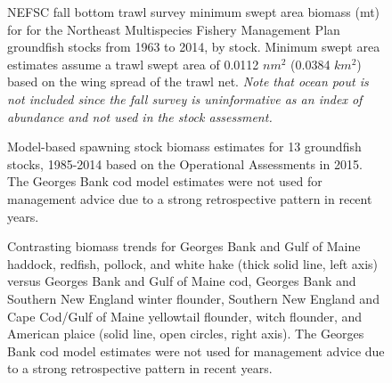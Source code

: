 	\begin{figure}
		\centering	
		\captionsetup{singlelinecheck=off}
		\caption[.]{NEFSC fall bottom trawl survey minimum swept area biomass (mt) for for the Northeast Multispecies Fishery Management Plan groundfish stocks from 1963 to 2014, by stock. Minimum swept area estimates assume a trawl swept area of 0.0112 $nm^{2}$ (0.0384 $km^{2}$) based on the wing spread of the trawl net. \textit{Note that ocean pout is not included since the fall survey is uninformative as an index of abundance and not used in the stock assessment.}	}
		\label{nefscFallMinSweptAreaBiomass}
	\end{figure}
	\clearpage





	\begin{figure}
		\centering	
		\captionsetup{singlelinecheck=off}
		\caption[.]{Model-based spawning stock biomass estimates for 13 groundfish stocks, 1985-2014 based on the Operational Assessments in 2015.  The Georges Bank cod model estimates were not used for management advice due to a strong retrospective pattern in recent years.}
		\label{ModelB}
	\end{figure}
	\clearpage


	\begin{figure}
		\centering	
		\captionsetup{singlelinecheck=off}
		\caption[.]{Contrasting biomass trends for  Georges Bank and Gulf of Maine haddock, redfish, pollock, and white hake (thick solid line, left axis) versus Georges Bank and Gulf of Maine cod, Georges Bank and Southern New England winter flounder, Southern New England  and Cape Cod/Gulf of Maine yellowtail flounder,  witch flounder, and American plaice (solid line, open circles, right axis). The Georges Bank cod model estimates were not used for management advice due to a strong retrospective pattern in recent years.}
		\label{ContrastBTrends}
	\end{figure}
	\clearpage


